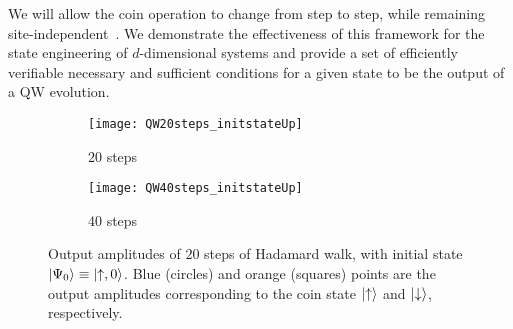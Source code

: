 We will allow the coin operation to change from step to step, while remaining site-independent~\cite{ribeiro2004aperiodic,wjcik2004quasiperiodic,bauls2006quantum}.
We demonstrate the effectiveness of this framework for the state engineering of $d$-dimensional systems and provide a set of efficiently verifiable necessary and sufficient conditions for a given state to be the output of a \ac{QW} evolution.

\begin{figure}[tb]
    \begin{subfigure}{0.5\textwidth}
        \centering
        \caption{$20$ steps}
        \texttt{[image: QW20steps\_initstateUp]}
    \end{subfigure}%
    \begin{subfigure}{0.5\textwidth}
        \centering
        \caption{$40$ steps}
        \texttt{[image: QW40steps\_initstateUp]}
    \end{subfigure}
    \caption{
    	Output amplitudes of $20$ steps of Hadamard walk, with initial state $\ket{\Psi_0}\equiv\ket{\uparrow,0}$.
        Blue (circles) and orange (squares) points are the output amplitudes corresponding to the coin state $\ket\uparrow$ and $\ket\downarrow$, respectively.
    }
    \label{fig:hadamardwalk_Nsteps2}
\end{figure}



